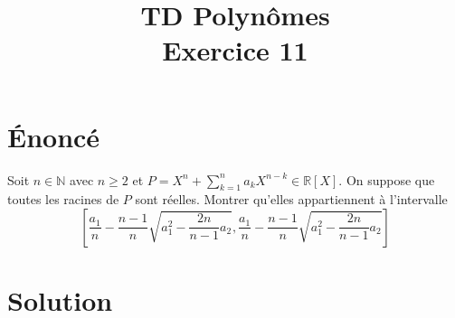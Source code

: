 \documentclass[french]{article}
\title{TD Polynômes \\ Exercice 11}
\date{}
\newcommand{\N}{\mathbb{N}}
\newcommand{\R}{\mathbb{R}}
\begin{document}
\maketitle

\section{Énoncé}
Soit $n\in\N$ avec $n\geqslant 2$ et $P=\displaystyle X^n+\sum_{k=1}^{n}a_kX^{n-k}\in\R[X]$. On suppose que toutes les racines de $P$ sont réelles. Montrer qu'elles appartiennent à l'intervalle $$\left[\frac{a_1}{n}-\frac{n-1}{n}\sqrt{a_1^2-\frac{2n}{n-1}a_2},\frac{a_1}{n}-\frac{n-1}{n}\sqrt{a_1^2-\frac{2n}{n-1}a_2}\right]$$
\section{Solution}
\end{document}
